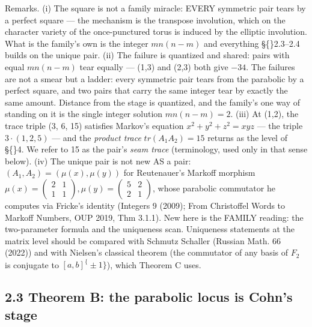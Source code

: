 \documentclass[11pt]{article}
\theoremstyle{plain}
\theoremstyle{definition}
\theoremstyle{remark}
\begin{document}
Remarks. (i) The square is not a family miracle: EVERY symmetric pair tears by a perfect square — the mechanism is the transpose involution, which on the character variety of the once-punctured torus is induced by the elliptic involution. What is the family's own is the integer \(mn(n-m)\) and everything \S\{\}2.3–2.4 builds on the unique pair. (ii) The failure is quantized and shared: pairs with equal \(mn(n-m)\) tear equally — (1,3) and (2,3) both give \(-34\). The failures are not a smear but a ladder: every symmetric pair tears from the parabolic by a perfect square, and two pairs that carry the same integer tear by exactly the same amount. Distance from the stage is quantized, and the family's one way of standing on it is the single integer solution \(mn(n-m) = 2\). (iii) At (1,2), the trace triple (3, 6, 15) satisfies Markov's equation \(x^{2}+y^{2}+z^{2} = xyz\) — the triple \(3\cdot (1,2,5)\) — and the \emph{product trace} \(tr(A_{1}A_{2}) = 15\) returns as the level of \S\{\}4. We refer to 15 as the pair's \emph{seam trace} (terminology, used only in that sense below). (iv) The unique pair is not new AS a pair: \((A_{1}, A_{2}) = (\mu (x), \mu (y))\) for Reutenauer's Markoff morphism \(\mu (x) = \left(\begin{smallmatrix}2 & 1\\1 & 1\end{smallmatrix}\right), \mu (y) = \left(\begin{smallmatrix}5 & 2\\2 & 1\end{smallmatrix}\right)\), whose parabolic commutator he computes via Fricke's identity (Integers 9 (2009); From Christoffel Words to Markoff Numbers, OUP 2019, Thm 3.1.1). New here is the FAMILY reading: the two-parameter formula and the uniqueness scan. Uniqueness statements at the matrix level should be compared with Schmutz Schaller (Russian Math. 66 (2022)) and with Nielsen's classical theorem (the commutator of any basis of \(F_{2}\) is conjugate to \([a,b]^\{\pm 1\}\)), which Theorem C uses.

\subsection{2.3 Theorem B: the parabolic locus is Cohn's stage}
\end{document}
